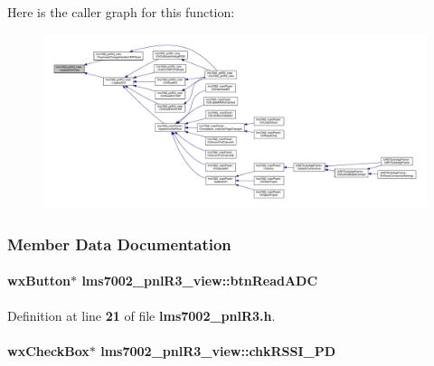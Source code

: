 Here is the caller graph for this function\+:
\nopagebreak
\begin{figure}[H]
\begin{center}
\leavevmode
\includegraphics[width=350pt]{d5/d55/classlms7002__pnlR3__view_a8f6158c063c80cf3b3d5dc1da27b1fd8_icgraph}
\end{center}
\end{figure}




\subsubsection{Member Data Documentation}
\paragraph[{btn\+Read\+A\+DC}]{\setlength{\rightskip}{0pt plus 5cm}wx\+Button$\ast$ lms7002\+\_\+pnl\+R3\+\_\+view\+::btn\+Read\+A\+DC\hspace{0.3cm}{\ttfamily [protected]}}\label{classlms7002__pnlR3__view_afdf1fbb42e1fb3f893076578e62b1923}


Definition at line {\bf 21} of file {\bf lms7002\+\_\+pnl\+R3.\+h}.

\paragraph[{chk\+R\+S\+S\+I\+\_\+\+PD}]{\setlength{\rightskip}{0pt plus 5cm}wx\+Check\+Box$\ast$ lms7002\+\_\+pnl\+R3\+\_\+view\+::chk\+R\+S\+S\+I\+\_\+\+PD\hspace{0.3cm}{\ttfamily [protected]}}\label{classlms7002__pnlR3__view_a51bad989b3e088baaf041ff161cff8a9}


